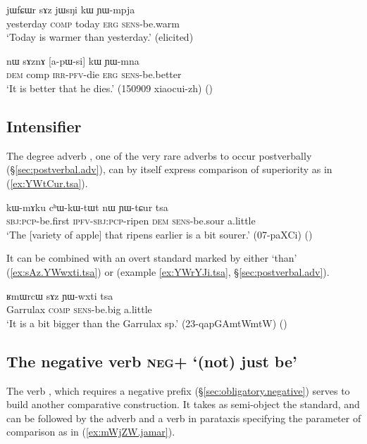 \begin{exe}
\ex \label{ex:comparative2}
\gll  jɯfɕɯr sɤz jɯsŋi kɯ ɲɯ-mpja \\
yesterday \textsc{comp} today \textsc{erg} \textsc{sens}-be.warm \\
\glt `Today is warmer than yesterday.' (elicited)
\end{exe}

\begin{exe}
\ex \label{ex:apWsi.kW}
\gll nɯ sɤznɤ [a-pɯ-si] kɯ ɲɯ-mna \\
\textsc{dem} comp \textsc{irr}-\textsc{pfv}-die \textsc{erg} \textsc{sens}-be.better \\
\glt `It is better that he dies.' (150909 xiaocui-zh)
()
\end{exe}

\subsection{Intensifier    } \label{sec:comparative.tsa}
The degree adverb , one of the very rare adverbs to occur postverbally (§\ref{sec:postverbal.adv}), can by itself express comparison of superiority as in (\ref{ex:YWtCur.tsa}).

\begin{exe}
\ex \label{ex:YWtCur.tsa}
\gll  kɯ-mɤku cʰɯ-kɯ-tɯt nɯ ɲɯ-tɕur tsa \\
\textsc{sbj}:\textsc{pcp}-be.first \textsc{ipfv}-\textsc{sbj}:\textsc{pcp}-ripen \textsc{dem} \textsc{sens}-be.sour a.little\\
\glt `The [variety of apple] that ripens earlier is a bit sourer.' (07-paXCi)
()
\end{exe}

It can be combined with an overt standard marked by either  `than' (\ref{ex:sAz.YWwxti.tsa}) or  (example \ref{ex:YWrYJi.tsa}, §\ref{sec:postverbal.adv}).

\begin{exe}
\ex \label{ex:sAz.YWwxti.tsa}
\gll  ʁmɯrcɯ sɤz ɲɯ-wxti tsa \\
Garrulax \textsc{comp} \textsc{sens}-be.big a.little \\
\glt `It is a bit bigger than the Garrulax sp.' (23-qapGAmtWmtW)
()
\end{exe}

\subsection{The negative verb \textsc{neg}+ `(not) just be'} \label{sec:mAZW}
The verb , which requires a negative prefix (§\ref{sec:obligatory.negative}) serves to build another comparative construction. It takes as semi-object the standard, and can be followed by the adverb  and a verb in parataxis specifying the parameter of comparison as in (\ref{ex:mWjZW.jamar}).

